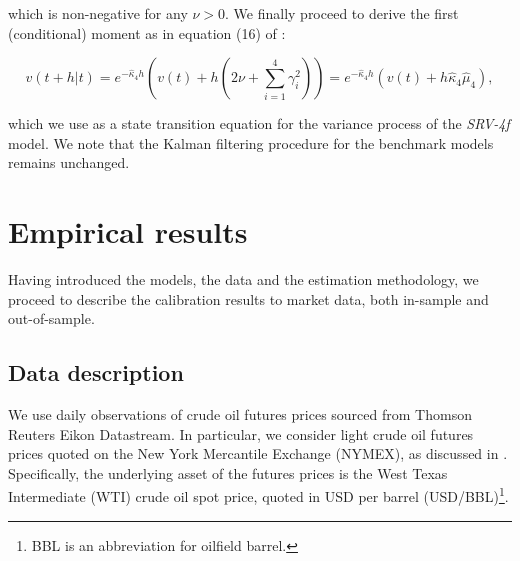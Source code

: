 \documentclass{article}
\begin{document}
\noindent which is non-negative for any $\nu > 0$. We finally proceed to derive the first (conditional) moment as in equation (16) of \cite{kelly23}:

\begin{equation} \label{eq_kelly3}
    v(t + h | t) = e^{ -\widehat{\kappa}_4 h} \left( v(t) + h \left( 2 \nu + \sum_{i=1}^4 \gamma^2_i  \right) \right)  = e^{ -\widehat{\kappa}_4 h} \left( v(t) + h \widehat{\kappa}_4 \widehat{\mu}_4 \right),
\end{equation}

\noindent which we use as a state transition equation for the variance process of the \textit{SRV-4f} model. We note that the Kalman filtering procedure for the benchmark models remains unchanged.

\section{Empirical results} \label{sec_empirical}

Having introduced the models, the data and the estimation methodology, we proceed to describe the calibration results to market data, both in-sample and out-of-sample.

\subsection{Data description} \label{sec_data_descrip}

We use daily observations of crude oil futures prices sourced from Thomson Reuters Eikon Datastream. In particular, we consider light crude oil futures prices quoted on the New York Mercantile Exchange (NYMEX), as discussed in \cite{hughen10}. Specifically, the underlying asset of the futures prices is the West Texas Intermediate (WTI) crude oil spot price, quoted in USD per barrel (USD/BBL)\footnote{BBL is an abbreviation for oilfield barrel.}.



\end{document}
